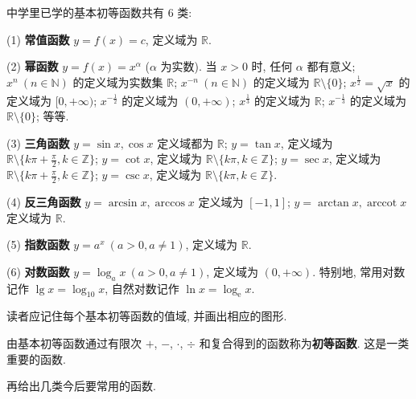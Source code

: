 中学里已学的基本初等函数共有 6 类:

(1) \textbf{常值函数} $y=f(x)=c$, 定义域为 $\mathbb{R}$.

(2) \textbf{幂函数} $y = f(x) = x^{\alpha}$ ($\alpha$ 为实数). 当 $x > 0$ 时, 任何 $\alpha$ 都有意义; $x^{n}\ (n \in \mathbb{N})$ 的定义域为实数集 $\mathbb{R}$; $x^{-n}\ (n \in \mathbb{N})$ 的定义域为 $\mathbb{R} \setminus \{0\}$; $x^{\frac{1}{2}} = \sqrt{x}$ 的定义域为 $[0, +\infty)$; $x^{-\frac{1}{2}}$ 的定义域为 $(0, +\infty)$; $x^{\frac{1}{3}}$ 的定义域为 $\mathbb{R}$; $x^{-\frac{1}{3}}$ 的定义域为 $\mathbb{R} \setminus \{0\}$; 等等.

(3) \textbf{三角函数} $y=\sin x, \cos x$ 定义域都为 $\mathbb{R}$; $y=\tan x$, 定义域为 $\mathbb{R} \setminus \{k\pi + \frac{\pi}{2}, k \in \mathbb{Z}\}$; $y=\cot x$, 定义域为 $\mathbb{R} \setminus \{k\pi, k \in \mathbb{Z}\}$; $y=\sec x$, 定义域为 $\mathbb{R} \setminus \{k\pi + \frac{\pi}{2}, k \in \mathbb{Z}\}$; $y=\csc x$, 定义域为 $\mathbb{R} \setminus \{k\pi, k \in \mathbb{Z}\}$.

(4) \textbf{反三角函数} $y=\arcsin x, \arccos x$ 定义域为 $[-1,1]$; $y=\arctan x, \operatorname{arccot} x$ 定义域为 $\mathbb{R}$.

(5) \textbf{指数函数} $y=a^{x}\ (a>0,a\neq1)$, 定义域为 $\mathbb{R}$.

(6) \textbf{对数函数} $y=\log_{a}x\ (a>0,a\neq1)$, 定义域为 $(0,+\infty)$. 特别地, 常用对数记作 $\lg x = \log_{10}x$, 自然对数记作 $\ln x = \log_{\mathrm{e}}x$.

读者应记住每个基本初等函数的值域, 并画出相应的图形.

\begin{definition}\label{def:2.1.2}
由基本初等函数通过有限次 $+$, $-$, $\cdot$, $\div$ 和复合得到的函数称为\textbf{初等函数}. 这是一类重要的函数.
\end{definition}

再给出几类今后要常用的函数.

